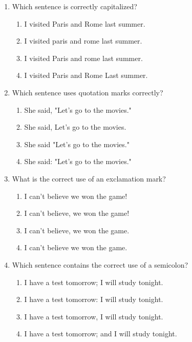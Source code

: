 \documentclass[12pt]{article}
\begin{document}
\begin{enumerate}
\vspace{0.5cm}

\item Which sentence is correctly capitalized?
\begin{enumerate}[label=\Alph*.]
    \item I visited Paris and Rome last summer.
    \item I visited paris and rome last summer.
    \item I visited Paris and rome last summer.
    \item I visited Paris and Rome Last summer.
\end{enumerate}

\vspace{0.5cm}

\item Which sentence uses quotation marks correctly?
\begin{enumerate}[label=\Alph*.]
    \item She said, "Let's go to the movies."
    \item She said, Let's go to the movies.
    \item She said "Let's go to the movies."
    \item She said: "Let's go to the movies."
\end{enumerate}

\vspace{0.5cm}

\item What is the correct use of an exclamation mark?
\begin{enumerate}[label=\Alph*.]
    \item I can't believe we won the game!
    \item I can't believe, we won the game!
    \item I can't believe, we won the game.
    \item I can't believe we won the game.
\end{enumerate}

\vspace{0.5cm}

\item Which sentence contains the correct use of a semicolon?
\begin{enumerate}[label=\Alph*.]
    \item I have a test tomorrow; I will study tonight.
    \item I have a test tomorrow: I will study tonight.
    \item I have a test tomorrow, I will study tonight.
    \item I have a test tomorrow; and I will study tonight.
\end{enumerate}


\end{enumerate}
\end{document}
